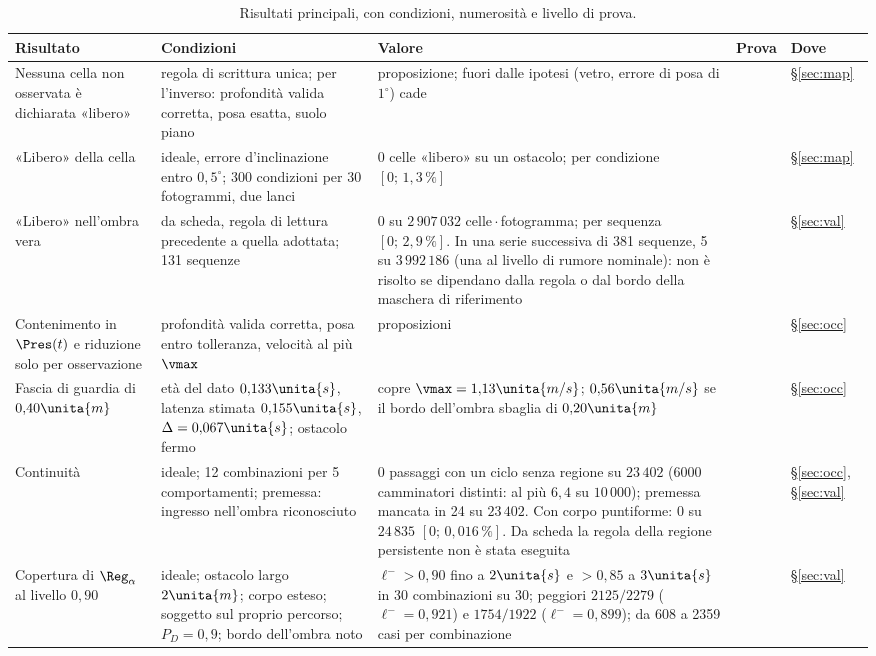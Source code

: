 \begin{table}[p]
\centering\footnotesize
\setlength{\tabcolsep}{4pt}
\caption{Risultati principali, con condizioni, numerosità e livello di prova.}\label{tab:intro-sintesi}
\begin{tabularx}{\textwidth}{@{}>{\RaggedRight\arraybackslash}p{2.8cm}>{\RaggedRight\arraybackslash}p{4.1cm}L>{\RaggedRight\arraybackslash}p{1.2cm}>{\RaggedRight\arraybackslash}p{1.05cm}@{}}
\toprule
Risultato & Condizioni & Valore & Prova & Dove\\
\midrule
Nessuna cella non osservata è dichiarata «libero» & regola di scrittura unica; per l'inverso: profondità valida corretta, posa esatta, suolo piano & proposizione; fuori dalle ipotesi (vetro, errore di posa di $1^\circ$) cade &  & \S\ref{sec:map}\\
«Libero» della cella & ideale, errore d'inclinazione entro $0{,}5^\circ$; 300 condizioni per 30 fotogrammi, due lanci & 0 celle «libero» su un ostacolo; per condizione $[0;\,1{,}3\,\%]$ &  & \S\ref{sec:map}\\
«Libero» nell'ombra vera & da scheda, regola di lettura precedente a quella adottata; 131 sequenze & 0 su $2\,907\,032$ celle\,$\cdot$\,fotogramma; per sequenza $[0;\,2{,}9\,\%]$. In una serie successiva di 381 sequenze, 5 su $3\,992\,186$ (una al livello di rumore nominale): non è risolto se dipendano dalla regola o dal bordo della maschera di riferimento &  & \S\ref{sec:val}\\
Contenimento in $\Pres(t)$ e riduzione solo per osservazione & profondità valida corretta, posa entro tolleranza, velocità al più $\vmax$ & proposizioni &  & \S\ref{sec:occ}\\
Fascia di guardia di $0{,}40\unita{m}$ & età del dato $0{,}133\unita{s}$, latenza stimata $0{,}155\unita{s}$, $\Delta=0{,}067\unita{s}$; ostacolo fermo & copre $\vmax=1{,}13\unita{m/s}$; $0{,}56\unita{m/s}$ se il bordo dell'ombra sbaglia di $0{,}20\unita{m}$ &  & \S\ref{sec:occ}\\
Continuità & ideale; 12 combinazioni per 5 comportamenti; premessa: ingresso nell'ombra riconosciuto & 0 passaggi con un ciclo senza regione su $23\,402$ (6000 camminatori distinti: al più $6{,}4$ su $10\,000$); premessa mancata in 24 su $23\,402$. Con corpo puntiforme: 0 su $24\,835$ $[0;\,0{,}016\,\%]$. Da scheda la regola della regione persistente non è stata eseguita &  & \S\ref{sec:occ}, \S\ref{sec:val}\\
Copertura di $\Reg_\alpha$ al livello $0{,}90$ & ideale; ostacolo largo $2\unita{m}$; corpo esteso; soggetto sul proprio percorso; $P_D=0{,}9$; bordo dell'ombra noto & $\ell^->0{,}90$ fino a $2\unita{s}$ e $>0{,}85$ a $3\unita{s}$ in 30 combinazioni su 30; peggiori $2125/2279$ ($\ell^-=0{,}921$) e $1754/1922$ ($\ell^-=0{,}899$); da 608 a 2359 casi per combinazione &  & \S\ref{sec:val}\\

\end{tabularx}
\end{table}
